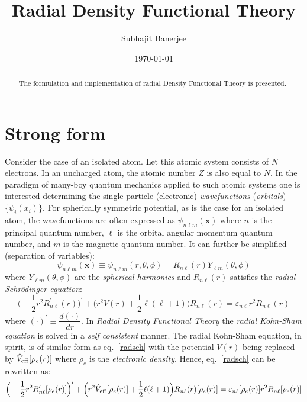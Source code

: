 \documentclass[12pt,dvipsnames]{article}
\newcommand{\vm}[1]{\mathbf{#1}}
\newcommand{\vx}{\vm{x}}
\begin{document}
\title{Radial Density Functional Theory}
\author{Subhajit Banerjee}
\date{\today}
\maketitle

\begin{abstract}
The formulation and implementation of radial Density Functional 
Theory is presented.  
\end{abstract}

\section{Strong form}
Consider the case of an isolated atom. Let this atomic system consists of 
$N$ electrons. In an uncharged atom, the atomic number $Z$ is also 
equal to $N$. In the paradigm of many-boy quantum  
mechanics applied to such atomic systems one is interested determining the 
single-particle (electronic) \emph{wavefunctions} (\emph{orbitals}) $\{ \psi_i(x_i) \}$. 
For spherically symmetric potential, as is the case for an isolated atom, the 
wavefunctions are often expressed as $\psi_{n \ell m} (\vx)$ where $n$ is the principal quantum number, 
$\ell$ is the orbital angular momentum quantum number, and $m$ is the magnetic quantum number. 
It can further be simplified (separation of variables):
$$\psi_{n \ell m} (\vx) \equiv \psi_{n \ell m} (r, \theta, \phi) = R_{n \ell}(r) Y_{\ell m}(\theta, \phi)$$
where $Y_{\ell m}(\theta, \phi)$ are the \emph{spherical harmonics} and $R_{n \ell}(r)$ satisfies the 
\emph{radial Schr{\"o}dinger equation}:
\begin{equation}	\label{radsch}
\Big( -\frac{1}{2} r^2 R^\prime_{n \ell}(r) \Big)^\prime + \Big( r^2 V(r) + \frac{1}{2} \ell (\ell + 1) \Big ) R_{n \ell}(r) = 
\varepsilon_{n \ell} r^2 R_{n \ell} (r)
\end{equation}
where $(\cdot)^\prime \equiv \dfrac{d(\cdot)}{dr}$.
\noindent
In \emph{Radial Density Functional Theory} the \emph {radial Kohn-Sham equation} is solved in a \emph{self consistent} manner. 
The radial Kohn-Sham equation, in spirit, is of similar form as eq.~\eqref{radsch} with the potential $V(r)$ 
being replaced by $\hat{V}_{\rm{eff}}[\rho_e(r)]$ where $\rho_e$ is the \emph{electronic density}. 
Hence, eq.~\eqref{radsch} can be rewritten as:
\begin{equation}	\label{radks}
\Big( -\frac{1}{2} r^2 R^\prime_{n \ell}[\rho_e(r)] \Big)^\prime + \Big( r^2 \hat{V}_{\rm{eff}}[\rho_e(r)] + \frac{1}{2} \ell (\ell + 1) \Big ) R_{n \ell}(r)[\rho_e(r)] = 
\varepsilon_{n \ell}[\rho_e(r)] r^2 R_{n \ell}[\rho_e(r)]
\end{equation}
\end{document}
